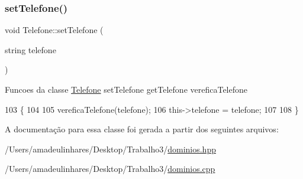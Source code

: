 \subsubsection{\texorpdfstring{set\+Telefone()}{setTelefone()}}
{\footnotesize\ttfamily void Telefone\+::set\+Telefone (\begin{DoxyParamCaption}\item[{string}]{telefone }\end{DoxyParamCaption})}

Funcoes da classe \mbox{\hyperlink{class_telefone}{Telefone}} set\+Telefone get\+Telefone verefica\+Telefone 
\begin{DoxyCode}
103 \{
104 
105     vereficaTelefone(telefone);
106     this->telefone = telefone;
107 
108 \}
\end{DoxyCode}


A documentação para essa classe foi gerada a partir dos seguintes arquivos\+:\begin{DoxyCompactItemize}
\item 
/\+Users/amadeulinhares/\+Desktop/\+Trabalho3/\mbox{\hyperlink{dominios_8hpp}{dominios.\+hpp}}\item 
/\+Users/amadeulinhares/\+Desktop/\+Trabalho3/\mbox{\hyperlink{dominios_8cpp}{dominios.\+cpp}}\end{DoxyCompactItemize}
